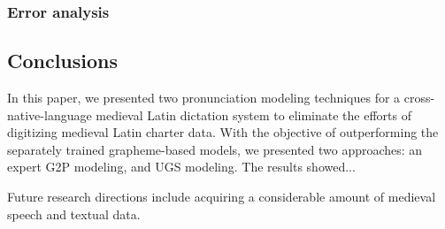 \documentclass[runningheads,a4paper]{llncs}
\begin{document}
\subsubsection{Error analysis}
\subsection{Conclusions}
In this paper, we presented two pronunciation modeling techniques for a cross-native-language medieval Latin dictation system to eliminate the efforts of digitizing medieval Latin charter data.
With the objective of outperforming the separately trained grapheme-based models, we presented two approaches: an expert G2P modeling, and UGS modeling.
The results showed...

Future research directions include acquiring a considerable amount of medieval speech and textual data.



\end{document}

